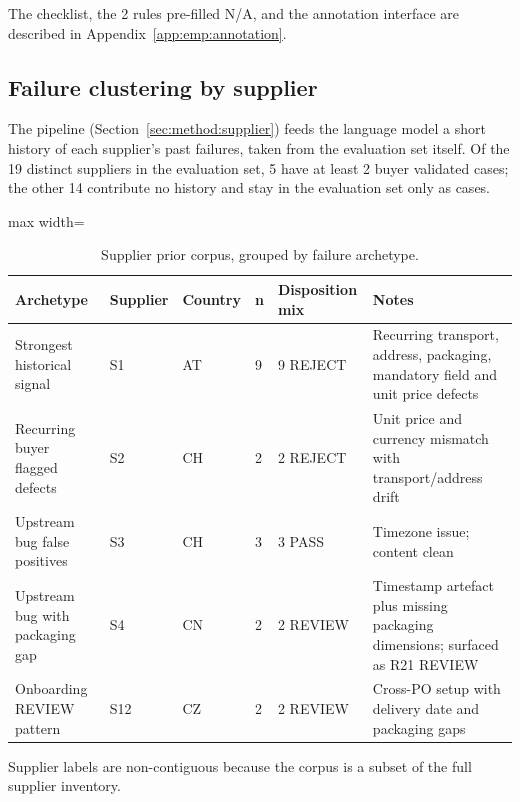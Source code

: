 The checklist, the 2 rules pre-filled N/A, and the annotation interface are described in Appendix~\ref{app:emp:annotation}.


\subsection{Failure clustering by supplier}
\label{sec:emp:clustering}

The pipeline (Section~\ref{sec:method:supplier}) feeds the language model a short history of each supplier's past failures, taken from the evaluation set itself. Of the 19 distinct suppliers in the evaluation set, 5 have at least 2 buyer validated cases; the other 14 contribute no history and stay in the evaluation set only as cases.

\begin{table}[htbp]
\centering
\caption{Supplier prior corpus, grouped by failure archetype.}
\label{tab:emp:suppliers}
\footnotesize
\begin{adjustbox}{max width=\textwidth}
\begin{tabular}{@{}lllll p{6cm}@{}}
\toprule
\textbf{Archetype} & \textbf{Supplier} & \textbf{Country} & \textbf{n} & \textbf{Disposition mix} & \textbf{Notes} \\
\midrule
Strongest historical signal       & S1  & AT & 9 & 9 REJECT  & Recurring transport, address, packaging, mandatory field and unit price defects \\
Recurring buyer flagged defects   & S2  & CH & 2 & 2 REJECT  & Unit price and currency mismatch with transport/address drift \\
Upstream bug false positives      & S3  & CH & 3 & 3 PASS    & Timezone issue; content clean \\
Upstream bug with packaging gap   & S4  & CN & 2 & 2 REVIEW  & Timestamp artefact plus missing packaging dimensions; surfaced as R21 REVIEW \\
Onboarding REVIEW pattern         & S12 & CZ & 2 & 2 REVIEW  & Cross-PO setup with delivery date and packaging gaps \\
\bottomrule
\end{tabular}
\end{adjustbox}
\par\vspace{0.2em}\footnotesize{Supplier labels are non-contiguous because the corpus is a subset of the full supplier inventory.}
\end{table}


